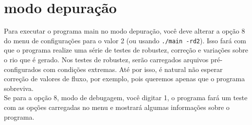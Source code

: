 \documentclass[11pt,a4paper]{article}
\begin{document}
\section{modo depuração}
Para executar o programa main no modo depuração, você deve alterar a opção 8 do menu de configurações para o valor 2 (ou usando \verb|./main -rd2|). Isso fará com que o programa realize uma série de testes de robustez, correção e variações sobre o rio que é gerado. Nos testes de robustez, serão carregados arquivos pré-configurados com condições extremas. Até por isso, é natural não esperar correção de valores de fluxo, por exemplo, pois queremos apenas que o programa sobreviva. \\

Se para a opção 8, modo de debugagem, você digitar 1, o programa fará um teste com as opções carregadas no menu e mostrará algumas informações sobre o programa. 
\end{document}
